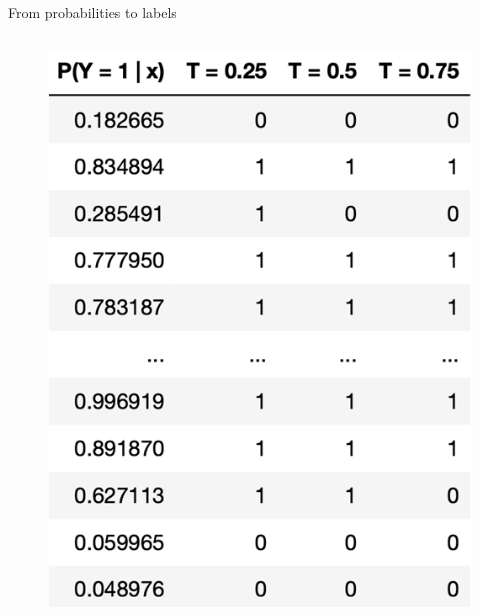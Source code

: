 \documentclass[aspectratio=169]{../latex_main/tntbeamer}  %
\begin{document}
\begin{frame}{From probabilities to labels}
\begin{columns}
	        
	        \begin{column}{.4\textwidth}
	                \begin{figure}
	                    \centering
	                    \includegraphics[scale=.5]{Bild6}
	                \end{figure}
	        \end{column}
	    \end{columns}
	\end{frame}
	
\end{document}
